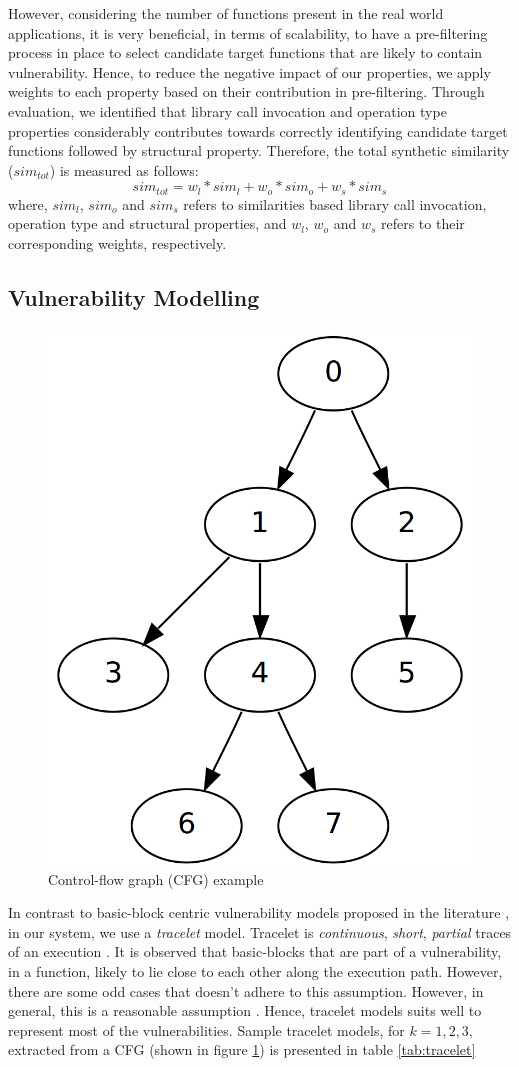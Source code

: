 However, considering the number of functions present in the real world applications, it is very beneficial, in terms of scalability, to have a pre-filtering process in place to select candidate target functions that are likely to contain vulnerability.   Hence, to reduce the negative impact of our properties, we apply weights to each property based on their contribution in pre-filtering. Through evaluation, we identified that library call invocation and operation type properties considerably contributes towards correctly identifying candidate target functions followed by structural property. Therefore, the total synthetic similarity ($sim_{tot}$) is measured as follows: 
\begin{equation} 
sim_{tot} = w_l*sim_l + w_o*sim_o + w_s*sim_s \label{eq:tot_syn_sim}
\end{equation}
where, $sim_l$, $sim_o$ and $sim_s$ refers to similarities based library call invocation, operation type and structural properties, and $w_l$, $w_o$ and $w_s$ refers to their corresponding weights, respectively.

\subsection{Vulnerability Modelling} \label{subsec:vul_mod}
\begin{figure}[t]
	\centering
	\includegraphics[width=.15\textwidth]{srj-figures/tracelet.png}
	\caption{Control-flow graph (CFG) example}\label{fig:tracelet}
\end{figure}
In contrast to basic-block centric vulnerability models proposed in the literature \cite{lakhotia2013fast}\cite{pewny2014leveraging}\cite{pewnycross}, in our system, we use a \textit{tracelet} model. Tracelet is \textit{continuous}, \textit{short}, \textit{partial} traces of an execution \cite{david2014tracelet}.
It is observed that basic-blocks that are part of a vulnerability, in a function, likely to lie close to each other along the execution path. However, there are some odd cases that doesn't adhere to this assumption. 
However, in general, this is a reasonable assumption \cite{pewnycross}\cite{pewny2014leveraging}. Hence, tracelet models suits well to represent most of the vulnerabilities. Sample tracelet models, for $k=1,2,3$, extracted from a CFG (shown in figure \ref{fig:tracelet}) is presented in table \ref{tab:tracelet}

